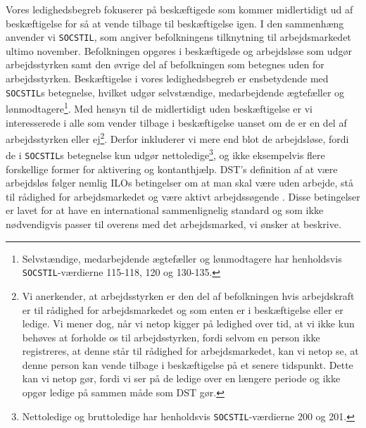 Vores ledighedsbegreb fokuserer på beskæftigede som kommer midlertidigt ud af beskæftigelse for så at vende tilbage til beskæftigelse igen. I den sammenhæng anvender vi \texttt{SOCSTIL}, som angiver befolkningens tilknytning til arbejdsmarkedet ultimo november. Befolkningen opgøres i beskæftigede og arbejdsløse som udgør arbejdsstyrken samt den øvrige del af befolkningen som betegnes uden for arbejdsstyrken. Beskæftigelse i vores ledighedsbegreb er ensbetydende med \texttt{SOCSTIL}s betegnelse, hvilket udgør selvstændige, medarbejdende ægtefæller og lønmodtagere\footnote{Selvstændige, medarbejdende ægtefæller og lønmodtagere har henholdsvis \texttt{SOCSTIL}-værdierne 115-118, 120 og 130-135.}. Med hensyn til de midlertidigt uden beskæftigelse er vi interesserede i alle som vender tilbage i beskæftigelse uanset om de er en del af arbejdsstyrken eller ej\footnote{Vi anerkender, at arbejdsstyrken er den del af befolkningen hvis arbejdskraft er til rådighed for arbejdsmarkedet og som enten er i beskæftigelse eller er ledige. Vi mener dog, når vi netop kigger på ledighed over tid, at vi ikke kun behøves at forholde os til arbejdsstyrken, fordi selvom en person ikke registreres, at denne står til rådighed for arbejdsmarkedet, kan vi netop se, at denne person kan vende tilbage i beskæftigelse på et senere tidspunkt. Dette kan vi netop gør, fordi vi ser på de ledige over en længere periode og ikke opgør ledige på sammen måde som DST gør.}. Derfor inkluderer vi mere end blot de arbejdsløse, fordi de i \texttt{SOCSTIL}s betegnelse kun udgør nettoledige\footnote{Nettoledige og bruttoledige har henholdsvis \texttt{SOCSTIL}-værdierne 200 og 201.}, og ikke eksempelvis flere forskellige former for aktivering og kontanthjælp. DST's definition af at være arbejdsløs følger nemlig ILOs betingelser om at man skal være uden arbejde, stå til rådighed for arbejdsmarkedet og være aktivt arbejdssøgende \parencite{ILO1982}. Disse betingelser er lavet for at have en international sammenlignelig standard og som ikke nødvendigvis passer til overens med det arbejdsmarked, vi ønsker at beskrive.

